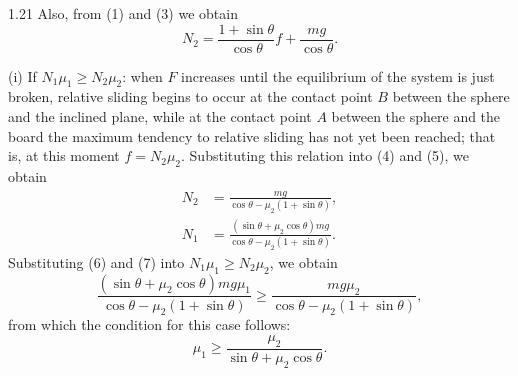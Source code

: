 \begin{solution}{1.21}
Also, from (1) and (3) we obtain
\begin{equation}
N_2=\frac{1+\sin\theta}{\cos\theta}f+\frac{mg}{\cos\theta}. \tag{5}
\end{equation}

(i) If $N_1\mu_1\geq N_2\mu_2$: when $F$ increases until the equilibrium of the system is just broken, relative sliding begins to occur at the contact point $B$ between the sphere and the inclined plane, while at the contact point $A$ between the sphere and the board the maximum tendency to relative sliding has not yet been reached; that is, at this moment $f=N_2\mu_2$. Substituting this relation into (4) and (5), we obtain
\begin{align}
N_2&=\frac{mg}{\cos\theta-\mu_2(1+\sin\theta)}, \tag{6}\\
N_1&=\frac{(\sin\theta+\mu_2\cos\theta)mg}{\cos\theta-\mu_2(1+\sin\theta)}. \tag{7}
\end{align}
Substituting (6) and (7) into $N_1\mu_1\geq N_2\mu_2$, we obtain
\[
\frac{(\sin\theta+\mu_2\cos\theta)mg\mu_1}{\cos\theta-\mu_2(1+\sin\theta)}
\geq\frac{mg\mu_2}{\cos\theta-\mu_2(1+\sin\theta)},
\]
from which the condition for this case follows:
\begin{equation}
\mu_1\geq\frac{\mu_2}{\sin\theta+\mu_2\cos\theta}. \tag{8}
\end{equation}


\end{solution}
